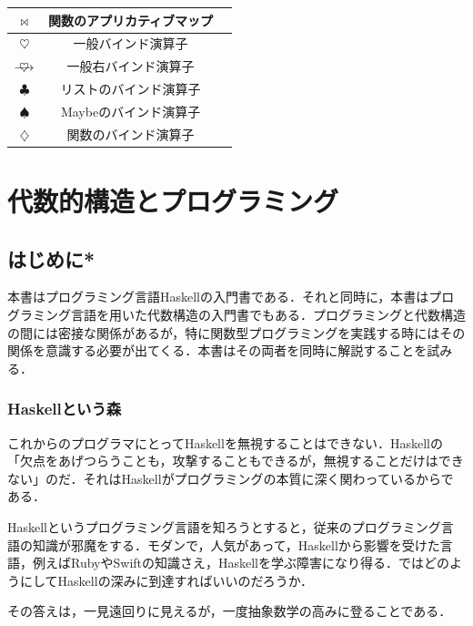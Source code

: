 \documentclass[a4paper,twocolumn]{jsbook}
\newcommand{\programminglanguage}[1]{\textsf{#1}}
\newcommand{\haskell}{\programminglanguage{Haskell}}
\newcommand{\ruby}{\programminglanguage{Ruby}}
\newcommand{\swift}{\programminglanguage{Swift}}
\newenvironment{leader}{\begingroup\gt}{\endgroup}
\DeclareMathOperator{\mAppMapFunc}{\bowtie}
\DeclareMathOperator{\mBind}{\heartsuit}
\DeclareMathOperator{\mBindFunc}{\diamondsuit}
\DeclareMathOperator{\mBindList}{\clubsuit}
\DeclareMathOperator{\mBindMaybe}{\spadesuit}
\DeclareMathOperator{\mBindRight}{\ooalign{$\longrightarrow$\crcr\hss$\mBind$\hss}}
\DeclareMathOperator{\mBindRightIgnore}{\twoheadrightarrow}
\begin{document}
\begin{table}[p]
\begin{center}
\begin{tabular}{||c|c|c||}
$\mAppMapFunc$&関数のアプリカティブマップ&\\
\hline
$\mBind$&一般バインド演算子&\\
$\mBindRight$&一般右バインド演算子&\\
$\mBindList$&リストのバインド演算子&\\
$\mBindMaybe$&Maybeのバインド演算子&\\
$\mBindFunc$&関数のバインド演算子&\\
\hline
\end{tabular}
\end{center}
\end{table}

\part{代数的構造とプログラミング}

\chapter{はじめに*}
\label{ch:introduction}

\begin{leader}
本書はプログラミング言語\haskell の入門書である．それと同時に，本書はプログラミング言語を用いた代数構造の入門書でもある．プログラミングと代数構造の間には密接な関係があるが，特に関数型プログラミングを実践する時にはその関係を意識する必要が出てくる．本書はその両者を同時に解説することを試みる．
\end{leader}

\section{\haskell という森}

これからのプログラマにとって\haskell を無視することはできない．\haskell の「欠点をあげつらうことも，攻撃することもできるが，無視することだけはできない」のだ．それは\haskell がプログラミングの本質に深く関わっているからである．

\haskell というプログラミング言語を知ろうとすると，従来のプログラミング言語の知識が邪魔をする．モダンで，人気があって，\haskell から影響を受けた言語，例えば\ruby や\swift の知識さえ，\haskell を学ぶ障害になり得る．ではどのようにして\haskell の深みに到達すればいいのだろうか．

その答えは，一見遠回りに見えるが，一度抽象数学の高みに登ることである．
\end{document}
